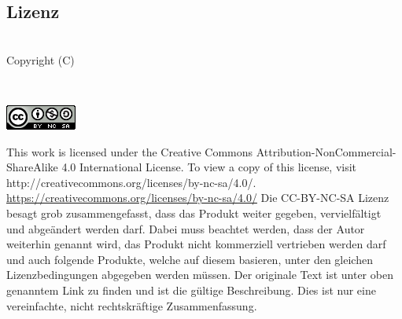 
\subsection*{\centering Lizenz}
\begin{center}
\textit{\thetitle}\\
Copyright (C) \date \theauthor\\

\begin{center}
        \href{https://creativecommons.org/licenses/by-nc-sa/4.0/}{\includegraphics{pictures/CC_by_nc_sa.png}}
\end{center}
This work is licensed under the Creative Commons Attribution-NonCommercial-ShareAlike 4.0 International License. To view a copy of this license, visit http://creativecommons.org/licenses/by-nc-sa/4.0/.
\url{https://creativecommons.org/licenses/by-nc-sa/4.0/}
\newline
\newline
Die CC-BY-NC-SA Lizenz besagt grob zusammengefasst, dass das Produkt weiter gegeben, vervielf\"altigt und abge\"andert werden darf. Dabei muss beachtet werden, dass der Autor weiterhin genannt wird, das Produkt nicht kommerziell vertrieben werden darf und auch folgende Produkte, welche auf diesem basieren, unter den gleichen Lizenzbedingungen abgegeben werden m\"ussen.
\newline
Der originale Text ist unter oben genanntem Link zu finden und ist die g\"ultige Beschreibung. Dies ist nur eine vereinfachte, nicht rechtskr\"aftige Zusammenfassung.
\end{center}
